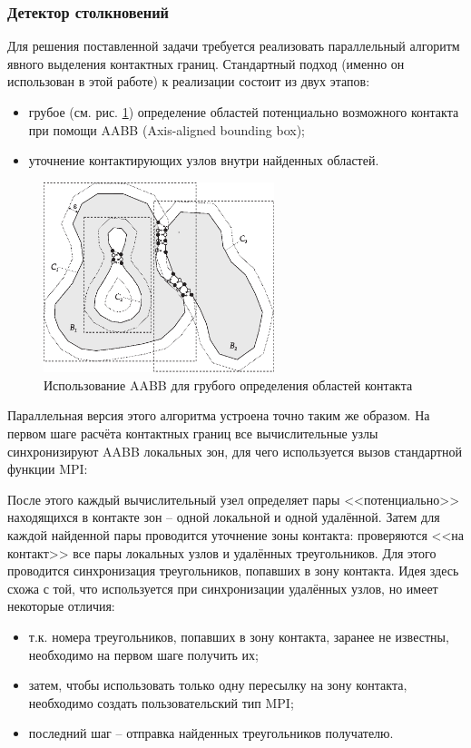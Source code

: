 \subsubsection{Детектор столкновений}
Для решения поставленной задачи требуется реализовать параллельный алгоритм явного выделения контактных границ. Стандартный подход (именно он использован в этой работе) к реализации состоит из двух этапов:
\begin{itemize}
	\item грубое (см. рис. \ref{pic:collision_detection}) определение областей потенциально возможного контакта при помощи AABB (Axis-aligned bounding box);
	\item уточнение контактирующих узлов внутри найденных областей.
\end{itemize}
\begin{figure}[htp]
\centering
\includegraphics[width=0.6\textwidth]{eps/collision_detection.eps}
\caption{Использование AABB для грубого определения областей контакта}
\label{pic:collision_detection}
\end{figure}
Параллельная версия этого алгоритма устроена точно таким же образом. На первом шаге расчёта контактных границ все вычислительные узлы синхронизируют AABB локальных зон, для чего используется вызов стандартной функции MPI:

После этого каждый вычислительный узел определяет пары <<потенциально>> находящихся в контакте зон -- одной локальной и одной удалённой. Затем для каждой найденной пары проводится уточнение зоны контакта: проверяются <<на контакт>> все пары локальных узлов и удалённых треугольников. Для этого проводится синхронизация треугольников, попавших в зону контакта. Идея здесь схожа с той, что используется при синхронизации удалённых узлов, но имеет некоторые отличия:
\begin{itemize}
	\item т.к. номера треугольников, попавших в зону контакта, заранее не известны, необходимо на первом шаге получить их;
	\item затем, чтобы использовать только одну пересылку на зону контакта, необходимо создать пользовательский тип MPI;
	\item последний шаг -- отправка найденных треугольников получателю.
\end{itemize}
